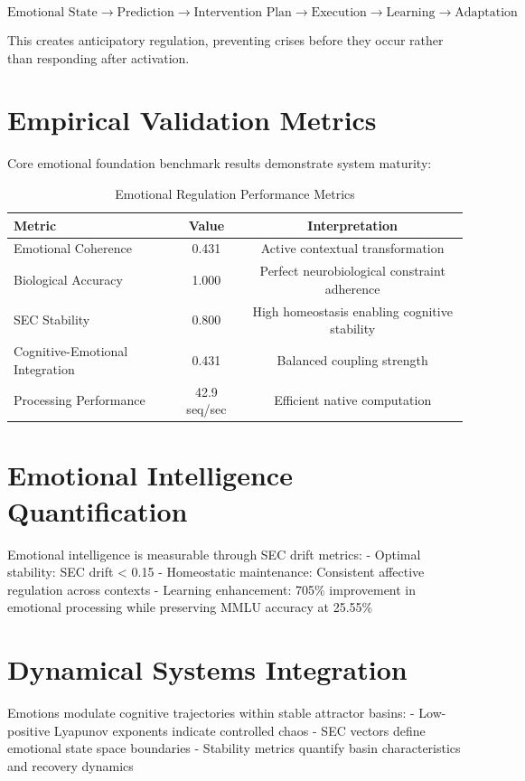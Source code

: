 \documentclass[12pt,a4paper]{report}
\begin{document}
\[
\text{Emotional State} \rightarrow \text{Prediction} \rightarrow \text{Intervention Plan} \rightarrow \text{Execution} \rightarrow \text{Learning} \rightarrow \text{Adaptation}
\]

This creates anticipatory regulation, preventing crises before they occur rather than responding after activation.

\section{Empirical Validation Metrics}

Core emotional foundation benchmark results demonstrate system maturity:

\begin{table}[H]
\centering
\caption{Emotional Regulation Performance Metrics}
\label{tab:emotional_metrics}
\begin{tabular}{@{}lcc@{}}
\toprule
Metric & Value & Interpretation \\
\midrule
Emotional Coherence & 0.431 & Active contextual transformation \\
Biological Accuracy & 1.000 & Perfect neurobiological constraint adherence \\
SEC Stability & 0.800 & High homeostasis enabling cognitive stability \\
Cognitive-Emotional Integration & 0.431 & Balanced coupling strength \\
Processing Performance & 42.9 seq/sec & Efficient native computation \\
\bottomrule
\end{tabular}
\end{table}

\section{Emotional Intelligence Quantification}

Emotional intelligence is measurable through SEC drift metrics:
- Optimal stability: SEC drift < 0.15
- Homeostatic maintenance: Consistent affective regulation across contexts
- Learning enhancement: 705\% improvement in emotional processing while preserving MMLU accuracy at 25.55\%

\section{Dynamical Systems Integration}

Emotions modulate cognitive trajectories within stable attractor basins:
- Low-positive Lyapunov exponents indicate controlled chaos
- SEC vectors define emotional state space boundaries
- Stability metrics quantify basin characteristics and recovery dynamics
\end{document}
